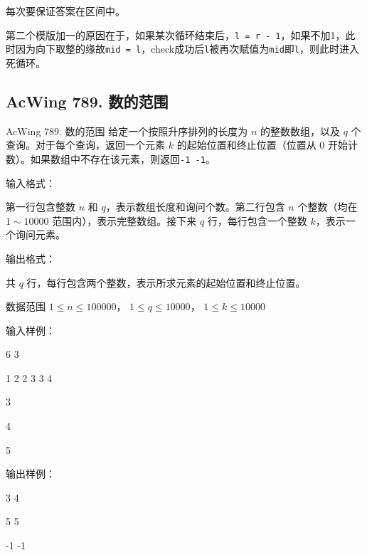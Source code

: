 \begin{keypoint}
    每次要保证答案在区间中。

    第二个模版加一的原因在于，如果某次循环结束后，\lstinline{l = r - 1}，如果不加1，此时因为向下取整的缘故\lstinline{mid = l}，check成功后\lstinline{l}被再次赋值为\lstinline{mid}即\lstinline{l}，则此时进入死循环。
\end{keypoint}

\subsection{AcWing 789. 数的范围}
\begin{titledbox}{AcWing 789. 数的范围}
给定一个按照升序排列的长度为 $n$ 的整数数组，以及 $q$ 个查询。对于每个查询，返回一个元素 $k$ 的起始位置和终止位置（位置从 $0$ 开始计数）。如果数组中不存在该元素，则返回\lstinline{-1 -1}。

输入格式：

第一行包含整数 $n$ 和 $q$，表示数组长度和询问个数。第二行包含 $n$ 个整数（均在 $1 \sim 10000$ 范围内），表示完整数组。接下来 $q$ 行，每行包含一个整数 $k$，表示一个询问元素。

输出格式：

共 $q$ 行，每行包含两个整数，表示所求元素的起始位置和终止位置。

数据范围
$1 \le n \le 100000$，
$1 \le q \le 10000$，
$1 \le k \le 10000$

输入样例：

6 3

1 2 2 3 3 4

3

4

5

输出样例：

3 4

5 5

-1 -1
\end{titledbox}


